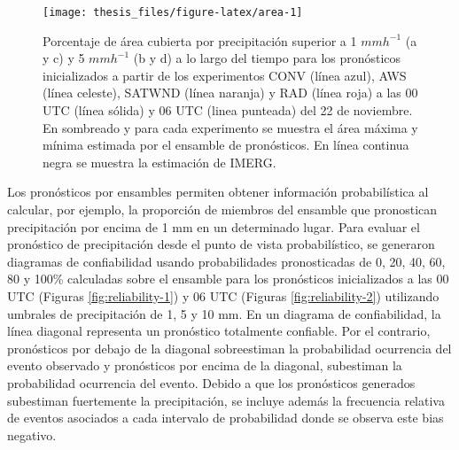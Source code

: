 \documentclass[12pt,oneside,a4paper]{reedthesis}
\begin{document}
\begin{figure}
\texttt{[image: thesis\_files/figure-latex/area-1]} \caption{Porcentaje de área cubierta por precipitación superior a 1 \(mmh^{-1}\) (a y c) y 5 \(mmh^{-1}\) (b y d) a lo largo del tiempo para los pronósticos inicializados a partir de los experimentos CONV (línea azul), AWS (línea celeste), SATWND (línea naranja) y RAD (línea roja) a las 00 UTC (línea sólida) y 06 UTC (linea punteada) del 22 de noviembre. En sombreado y para cada experimento se muestra el área máxima y mínima estimada por el ensamble de pronósticos. En línea continua negra se muestra la estimación de IMERG.}\label{fig:area}
\end{figure}
Los pronósticos por ensambles permiten obtener información probabilística al calcular, por ejemplo, la proporción de miembros del ensamble que pronostican precipitación por encima de 1 mm en un determinado lugar. Para evaluar el pronóstico de precipitación desde el punto de vista probabilístico, se generaron diagramas de confiabilidad usando probabilidades pronosticadas de 0, 20, 40, 60, 80 y 100\% calculadas sobre el ensamble para los pronósticos inicializados a las 00 UTC (Figuras \ref{fig:reliability-1}) y 06 UTC (Figuras \ref{fig:reliability-2}) utilizando umbrales de precipitación de 1, 5 y 10 mm. En un diagrama de confiabilidad, la línea diagonal representa un pronóstico totalmente confiable. Por el contrario, pronósticos por debajo de la diagonal sobreestiman la probabilidad ocurrencia del evento observado y pronósticos por encima de la diagonal, subestiman la probabilidad ocurrencia del evento. Debido a que los pronósticos generados subestiman fuertemente la precipitación, se incluye además la frecuencia relativa de eventos asociados a cada intervalo de probabilidad donde se observa este bias negativo.
\end{document}
